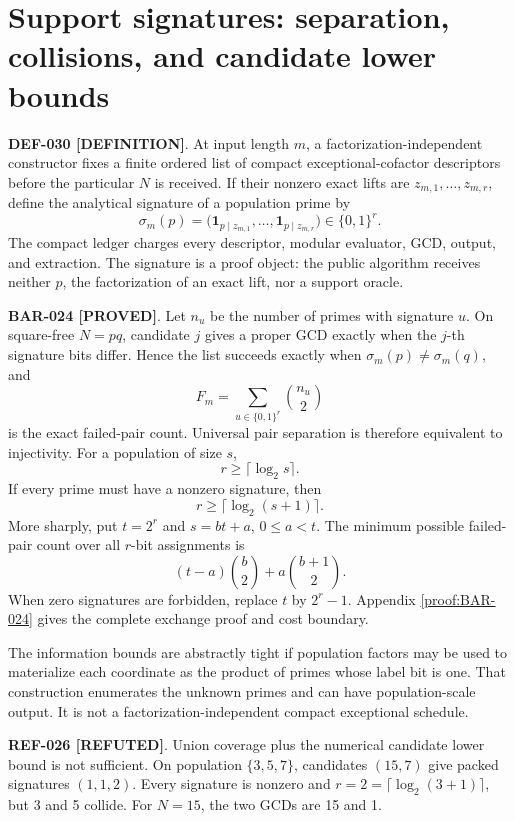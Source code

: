 \documentclass[11pt]{article}
\newcommand{\claimstatus}[2]{\textbf{#1 [#2]}}
\begin{document}
\section{Support signatures: separation, collisions, and candidate lower bounds}

\claimstatus{DEF-030}{DEFINITION}. At input length \(m\), a
factorization-independent constructor fixes a finite ordered list of compact
exceptional-cofactor descriptors before the particular \(N\) is received.
If their nonzero exact lifts are \(z_{m,1},\ldots,z_{m,r}\), define the
analytical signature of a population prime by
\[
\sigma_m(p)=
\bigl(\mathbf1_{p\mid z_{m,1}},\ldots,
      \mathbf1_{p\mid z_{m,r}}\bigr)\in\{0,1\}^r.
\]
The compact ledger charges every descriptor, modular evaluator, GCD, output,
and extraction. The signature is a proof object: the public algorithm
receives neither \(p\), the factorization of an exact lift, nor a support
oracle.

\claimstatus{BAR-024}{PROVED}. Let \(n_u\) be the number of primes with
signature \(u\). On square-free \(N=pq\), candidate \(j\) gives a proper GCD
exactly when the \(j\)-th signature bits differ. Hence the list succeeds
exactly when \(\sigma_m(p)\ne\sigma_m(q)\), and
\[
F_m=\sum_{u\in\{0,1\}^r}\binom{n_u}{2}
\]
is the exact failed-pair count. Universal pair separation is therefore
equivalent to injectivity. For a population of size \(s\),
\[
r\ge\lceil\log_2s\rceil.
\]
If every prime must have a nonzero signature, then
\[
r\ge\lceil\log_2(s+1)\rceil.
\]
More sharply, put \(t=2^r\) and \(s=bt+a\), \(0\le a<t\). The minimum
possible failed-pair count over all \(r\)-bit assignments is
\[
(t-a)\binom b2+a\binom{b+1}{2}.
\]
When zero signatures are forbidden, replace \(t\) by \(2^r-1\). Appendix
\ref{proof:BAR-024} gives the complete exchange proof and cost boundary.

The information bounds are abstractly tight if population factors may be
used to materialize each coordinate as the product of primes whose label bit
is one. That construction enumerates the unknown primes and can have
population-scale output. It is not a factorization-independent compact
exceptional schedule.

\claimstatus{REF-026}{REFUTED}. Union coverage plus the numerical candidate
lower bound is not sufficient. On population \(\{3,5,7\}\), candidates
\((15,7)\) give packed signatures \((1,1,2)\). Every signature is nonzero and
\(r=2=\lceil\log_2(3+1)\rceil\), but 3 and 5 collide. For \(N=15\), the two
GCDs are 15 and 1.
\end{document}
